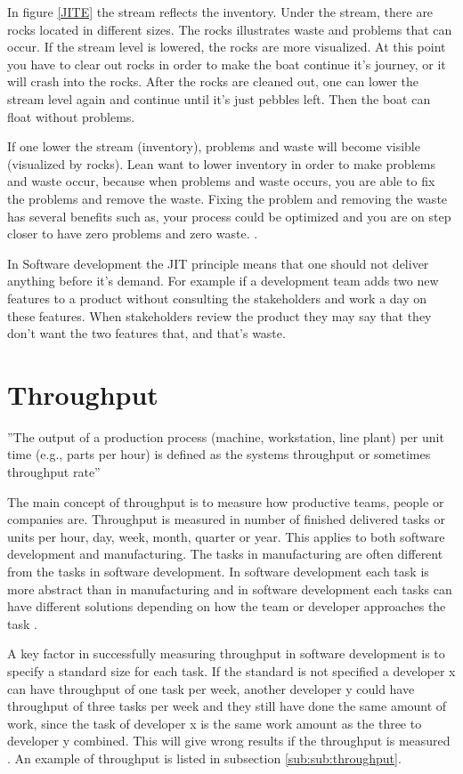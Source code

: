 \documentclass[UKenglish]{ifimaster}  %
\begin{document}
In figure \ref{JITE} the stream reflects the inventory.  Under the stream, there are rocks located in different sizes. The rocks illustrates waste and problems that can occur.  If the stream level is lowered, the rocks are more visualized. At this point you have to clear out rocks in order to make the boat continue it's journey, or it will crash into the rocks. After the rocks are cleaned out, one can lower the stream level again and continue until it's just pebbles left. Then the boat can float without problems.

If one lower the stream (inventory), problems and waste will become visible (visualized by rocks). Lean want to lower inventory in order to make problems and waste occur, because when problems and waste occurs, you are able to fix the problems and remove the waste. Fixing the problem and removing the waste has several benefits such as, your process could be optimized and you are on step closer to have zero problems and zero waste.  \parencite{JIT} \parencite{Lean:2006}.

In Software development the JIT principle means that one should not deliver anything before it's demand. For example if a development team adds two new features to a product without consulting the stakeholders and work a day on these features. When stakeholders review the product they may say that they don't want the two features that, and that's waste. 

\section{Throughput}
''The output of a production process (machine, workstation, line plant) per unit time (e.g., parts per hour) is defined as the systems throughput or sometimes throughput rate'' \parencite{Adams}

The main concept of throughput is to measure how productive teams, people or companies are. Throughput is measured in number of finished delivered tasks or units per hour, day, week, month, quarter or year. This applies to both software development and manufacturing. The tasks in manufacturing are often different from the tasks in software development. In software development each task is more abstract than in manufacturing and in software development each tasks can have different solutions depending on how the team or developer approaches the task \parencite{Throughput}.

A key factor in successfully measuring throughput in software development is to specify a standard size for each task. If the standard is not specified a developer x can have throughput of one task per week, another developer y could have throughput of three tasks per week and they still have done the same amount of work, since the task of developer x is the same work amount as the three to developer y combined.  This will give wrong results if the throughput is measured \parencite{Throughput}. An example of throughput is listed in subsection \ref{sub:sub:throughput}. 
\end{document}
